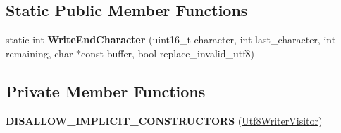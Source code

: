 \subsection*{Static Public Member Functions}
\begin{DoxyCompactItemize}
\item 
static int {\bfseries Write\+End\+Character} (uint16\+\_\+t character, int last\+\_\+character, int remaining, char $\ast$const buffer, bool replace\+\_\+invalid\+\_\+utf8)\hypertarget{classv8_1_1_utf8_writer_visitor_a2eebbdadedbf85598f175196b22cfe48}{}\label{classv8_1_1_utf8_writer_visitor_a2eebbdadedbf85598f175196b22cfe48}

\end{DoxyCompactItemize}
\subsection*{Private Member Functions}
\begin{DoxyCompactItemize}
\item 
{\bfseries D\+I\+S\+A\+L\+L\+O\+W\+\_\+\+I\+M\+P\+L\+I\+C\+I\+T\+\_\+\+C\+O\+N\+S\+T\+R\+U\+C\+T\+O\+RS} (\hyperlink{classv8_1_1_utf8_writer_visitor}{Utf8\+Writer\+Visitor})\hypertarget{classv8_1_1_utf8_writer_visitor_ae066cf377aa543d208293c7800a504c4}{}\label{classv8_1_1_utf8_writer_visitor_ae066cf377aa543d208293c7800a504c4}

\end{DoxyCompactItemize}
